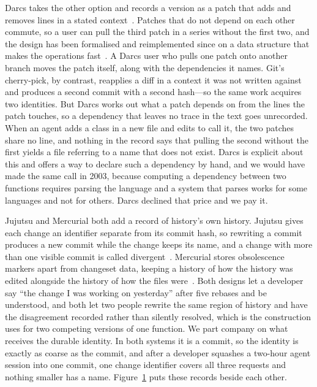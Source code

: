 Darcs takes the other option and records a version as a patch that adds and
removes lines in a stated context~\cite{roundy2005}. Patches that do not depend on
each other commute, so a user can pull the third patch in a series without the
first two, and the design has been formalised and reimplemented since on a data
structure that makes the operations fast~\cite{jacobson2009,mimram2013,pijul2024}.
A Darcs user who pulls one patch onto another branch moves the patch itself,
along with the dependencies it names. Git's cherry-pick, by contrast, reapplies
a diff in a context it was not written against and produces a second commit with
a second hash---so the same work acquires two identities. But Darcs works out what a patch depends on from the
lines the patch touches, so a dependency that leaves no trace in the text goes
unrecorded. When an agent adds a  class in a new file and edits
 to call it, the two patches share no line, and nothing in the
record says that pulling the second without the first yields a file referring to a
name that does not exist. Darcs is explicit about this and offers a way to declare
such a dependency by hand, and we would have made the same call in 2003, because
computing a dependency between two functions requires parsing the language and a
system that parses works for some languages and not for others. Darcs declined
that price and we pay it.

\begin{figure}[t]
  \centering
  
  \Description{\FigTwoDescription}
  \caption{\FigTwoCaption}
  \label{fig:granularity}
\end{figure}

Jujutsu and Mercurial both add a record of history's own history. Jujutsu gives
each change an identifier separate from its commit hash, so rewriting a commit
produces a new commit while the change keeps its name, and a change with more than
one visible commit is called divergent~\cite{jjglossary2026,jujutsu2026}.
Mercurial stores obsolescence markers apart from changeset data, keeping a history
of how the history was edited alongside the history of how the files
were~\cite{mercurial2026}. Both designs let
a developer say ``the change I was working on yesterday'' after five rebases and
be understood, and both let two people rewrite the same region of history and have
the disagreement recorded rather than silently resolved, which is the construction
\sgt{} uses for two competing versions of one function. We part company on what
receives the durable identity. In both systems it is a commit, so the identity is
exactly as coarse as the commit, and after a developer squashes a two-hour agent
session into one commit, one change identifier covers all three requests and
nothing smaller has a name. Figure~\ref{fig:granularity} puts these records beside
each other.

